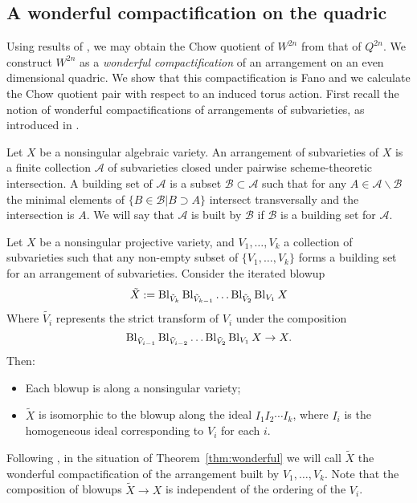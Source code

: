 \subsection{A wonderful compactification on the quadric} \label{subsec:wonderful}
Using results of \cite{kirwan}, we may obtain the Chow quotient of \(W^{2n}\) from that of \(Q^{2n}\). We construct \(W^{2n}\) as a \textit{wonderful compactification} of an arrangement on an even dimensional quadric. We show that this compactification is Fano and we calculate the Chow quotient pair with respect to an induced torus action. First recall the notion of wonderful compactifications of arrangements of subvarieties, as introduced in \cite{li06}.
\begin{definition}
Let \(X\) be a nonsingular algebraic variety. An arrangement of subvarieties of \(X\) is a finite collection \(\mathcal{A}\) of subvarieties closed under pairwise scheme-theoretic intersection. A building set of \(\mathcal{A}\) is a subset \(\mathcal{B} \subset \mathcal{A}\) such that for any \(A \in \mathcal{A} \backslash \mathcal{B}\) the minimal elements of \(\{B \in \mathcal{B} | B \supset A\}\) intersect transversally and the intersection is \(A\). We will say that \(\mathcal{A}\) is built by \(\mathcal{B}\) if \(\mathcal{B}\) is a building set for \(\mathcal{A}\).
\end{definition}
\begin{theorem}[{\cite[Theorem 1.3]{li06}}] \label{thm:wonderful}
Let \(X\) be a nonsingular projective variety, and \(V_1,\dots,V_k\) a collection of subvarieties such that any non-empty subset of \(\{V_1,\dots, V_k\}\) forms a building set for an arrangement of subvarieties. Consider the iterated blowup
\[
\tilde{X} := \operatorname{Bl}_{\tilde{V}_k} \operatorname{Bl}_{\tilde{V}_{k-1}} \dots \operatorname{Bl}_{\tilde{V}_2} \operatorname{Bl}_{V_1} X
\]
Where \(\tilde{V_i}\) represents the strict transform of \(V_i\) under the composition
\[
\operatorname{Bl}_{\tilde{V}_{i-1}} \operatorname{Bl}_{\tilde{V}_{i-2}} \dots \operatorname{Bl}_{\tilde{V}_2} \operatorname{Bl}_{V_1} X \to X.
\]
Then:
\begin{itemize}
\item Each blowup is along a nonsingular variety;
\item \(\tilde{X}\) is isomorphic to the blowup along the ideal \(I_1 I_2 \cdots I_k\), where \(I_i\) is the homogeneous ideal corresponding to \(V_i\) for each \(i\).
\end{itemize}
\end{theorem}
Following \cite{li06}, in the situation of Theorem~\ref{thm:wonderful} we will call \(\tilde{X}\) the wonderful compactification of the arrangement built by \(V_1,\dots,V_k\). Note that the composition of blowups \(\tilde{X} \to X\) is independent of the ordering of the \(V_i\).


